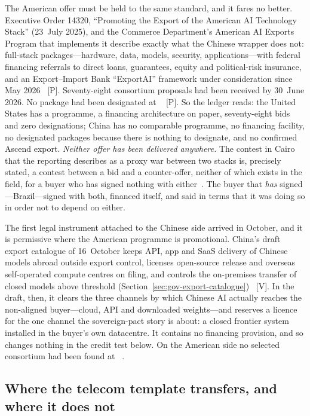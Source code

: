 The American offer must be held to the same standard, and it fares no better. Executive Order 14320, ``Promoting the Export of the American AI Technology Stack'' (23~July 2025), and the Commerce Department's American AI Exports Program that implements it describe exactly what the Chinese wrapper does not: full-stack packages---hardware, data, models, security, applications---with federal financing referrals to direct loans, guarantees, equity and political-risk insurance, and an Export--Import Bank ``ExportAI'' framework under consideration since May 2026~\cite{us-ai-exports} [P]. Seventy-eight consortium proposals had been received by 30~June 2026. No package had been designated at \datafreeze~\cite{us-ai-exports} [P]. So the ledger reads: the United States has a programme, a financing architecture on paper, seventy-eight bids and zero designations; China has no comparable programme, no financing facility, no designated packages because there is nothing to designate, and no confirmed Ascend export. \emph{Neither offer has been delivered anywhere.} The contest in Cairo that the reporting describes as a proxy war between two stacks is, precisely stated, a contest between a bid and a counter-offer, neither of which exists in the field, for a buyer who has signed nothing with either~\cite{huawei-egypt,us-ai-exports}. The buyer that \emph{has} signed---Brazil---signed with both, financed itself, and said in terms that it was doing so in order not to depend on either.

The first legal instrument attached to the Chinese side arrived in October, and it is permissive where the American programme is promotional. China's draft export catalogue of 16~October keeps API, app and SaaS delivery of Chinese models abroad outside export control, licenses open-source release and overseas self-operated compute centres on filing, and controls the on-premises transfer of closed models above threshold (Section~\ref{sec:gov-export-catalogue})~\cite{gov-mofcom-catalogue} [V]. In the draft, then, it clears the three channels by which Chinese AI actually reaches the non-aligned buyer---cloud, API and downloaded weights---and reserves a licence for the one channel the sovereign-pact story is about: a closed frontier system installed in the buyer's own datacentre. It contains no financing provision, and so changes nothing in the credit test below. On the American side no selected consortium had been found at \datafreeze~\cite{us-ai-exports}.

\subsection{Where the telecom template transfers, and where it does not}

